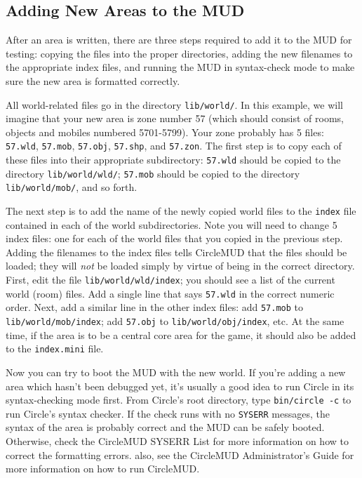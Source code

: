 \documentclass[11pt]{article}
\begin{document}
\subsection{Adding New Areas to the MUD}
After an area is written, there are three steps required to add it to the MUD for testing: copying the files into the proper directories, adding the new filenames to the appropriate index files, and running the MUD in syntax-check mode to make sure the new area is formatted correctly. 
\par
All world-related files go in the directory \texttt{lib/world/}. In this example, we will imagine that your new area is zone number 57 (which should consist of rooms, objects and mobiles numbered 5701-5799).  Your zone probably has 5 files: \texttt{57.wld}, \texttt{57.mob}, \texttt{57.obj}, \texttt{57.shp}, and \texttt{57.zon}. The first step is to copy each of these files into their appropriate
subdirectory: \texttt{57.wld} should be copied to the directory \texttt{lib/world/wld/}; \texttt{57.mob} should be copied to the directory \texttt{lib/world/mob/}, and so forth.
\par
The next step is to add the name of the newly copied world files to the \texttt{index} file contained in each of the world subdirectories.  Note you will need to change 5 index files: one for each of the world files that you copied in the previous step.  Adding the filenames to the index files tells CircleMUD that the files should be loaded; they will {\em not} be loaded simply by virtue of being in the correct directory. First, edit the file \texttt{lib/world/wld/index}; you should see a list of the current world (room) files.  Add a single line that says \texttt{57.wld} in the correct numeric order.  Next, add a similar line in the other index files: add \texttt{57.mob} to \texttt{lib/world/mob/index}; add \texttt{57.obj} to \texttt{lib/world/obj/index}, etc.  At the same time, if the area is to be a central core area for the game, it should also be added to the \texttt{index.mini} file.
\par
Now you can try to boot the MUD with the new world.  If you're adding a new area which hasn't been debugged yet, it's usually a good idea to run Circle in its syntax-checking mode first.  From Circle's root directory, type \texttt{bin/circle -c} to run Circle's syntax checker. If the check runs with no \texttt{SYSERR} messages, the syntax of the area is probably correct and the MUD can be safely booted.  Otherwise, check the CircleMUD SYSERR List for more information on how to correct the formatting errors.  also, see the CircleMUD Administrator's Guide for more information on how to run CircleMUD.
\end{document}
